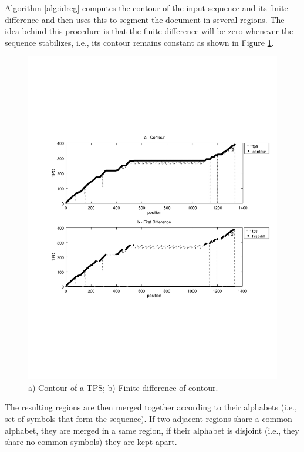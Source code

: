 \documentclass{vldb}
\begin{document}
Algorithm \ref{alg:idreg} computes the contour of the input sequence and its
finite difference and then uses this to segment the document in several regions.
The idea behind this procedure is that the finite difference will be zero
whenever the sequence stabilizes, i.e., its contour remains constant as shown in
Figure \ref{fig:contour}.

\begin{figure}[h]
  \centering
     \includegraphics[trim={2.5cm 7.5cm 1cm 6.5cm}, width=\linewidth
     ]{img/contour.pdf}
  \caption{a) Contour of a TPS; b) Finite difference of contour.}
  \label{fig:contour}
\end{figure}

The resulting regions are then merged together according to their alphabets
(i.e., set of symbols that form the sequence). If two adjacent regions share a
common alphabet, they are merged in a same region, if their alphabet is disjoint
(i.e., they share no common symbols) they are kept apart.
\end{document}
